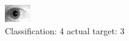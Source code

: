 \begin{figure}[h!]
\begin{center}
\includegraphics[width=0.60\columnwidth]{figures/ID1857_class_4_target_3.png}
\end{center}
\caption{ Classification: 4 actual target: 3}
\label{fig:ID1857_class_4_target_3}
\end{figure}
